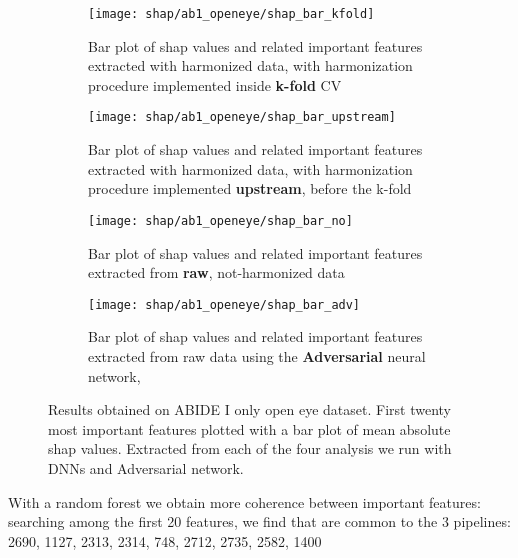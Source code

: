 \documentclass[11pt]{report}
\begin{document}
\begin{figure}[h!]
\centering
\begin{subfigure}[c]{.45\linewidth}
  \texttt{[image: shap/ab1\_openeye/shap\_bar\_kfold]}
   \caption{Bar plot of shap values and related important features extracted with harmonized data, with harmonization procedure implemented inside \textbf{k-fold} CV}
   \label{fig:shap_bar_kfold_}
\end{subfigure}
\begin{subfigure}[c]{.45\textwidth}
   \texttt{[image: shap/ab1\_openeye/shap\_bar\_upstream]}
   \caption{Bar plot of shap values and related important features extracted with harmonized data, with harmonization procedure implemented \textbf{upstream}, before the k-fold}
   \label{}
\end{subfigure}
\hspace{3mm}
\begin{subfigure}[c]{.45\textwidth}
   \texttt{[image: shap/ab1\_openeye/shap\_bar\_no]}
   \caption{Bar plot of shap values and related important features extracted from \textbf{raw}, not-harmonized data}
   \label{}
\end{subfigure}
\begin{subfigure}[c]{.45\textwidth}
   \texttt{[image: shap/ab1\_openeye/shap\_bar\_adv]}
   \caption{Bar plot of shap values and related important features extracted from raw data using the \textbf{Adversarial} neural network,}
   \label{}
\end{subfigure}
\caption{Results obtained on ABIDE I only open eye dataset. First twenty most important features plotted with a bar plot of mean absolute shap values. Extracted from each of the four analysis we run with DNNs and Adversarial network. }
\label{fig:shap_abide_all}
\end{figure}





With a random forest we obtain more coherence between important features: searching among the first 20 features, we find that
are common to the 3 pipelines: 2690, 1127, 2313, 2314, 748, 2712, 2735, 2582, 1400
\end{document}

